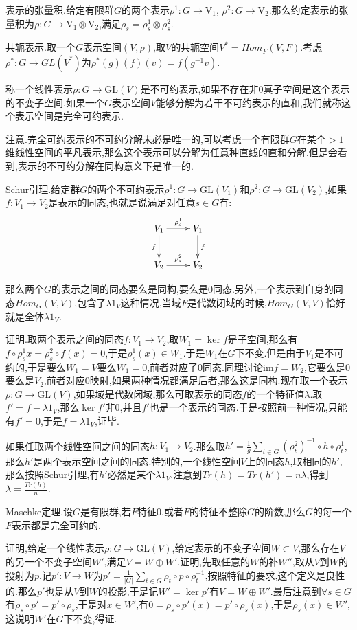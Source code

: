 表示的张量积.给定有限群$G$的两个表示$\rho^1:G\to\mathrm{V_1}$, $\rho^2:G\to\mathrm{V_2}$.那么约定表示的张量积为$\rho:G\to\mathrm{V_1\otimes V_2}$,满足$\rho_s=\rho_s^1\otimes\rho_s^2$.

共轭表示.取一个$G$表示空间$(V,\rho)$,取$V$的共轭空间$V^*=Hom_F(V,F)$.考虑$\rho^*:G\to GL(V^*)$为$\rho^*(g)(f)(v)=f(g^{-1}v)$.

称一个线性表示$\rho:G\to\mathrm{GL}(V)$是不可约表示,如果不存在非0真子空间是这个表示的不变子空间.如果一个$G$表示空间$V$能够分解为若干不可约表示的直和,我们就称这个表示空间是完全可约表示.

注意.完全可约表示的不可约分解未必是唯一的,可以考虑一个有限群$G$在某个$>1$维线性空间的平凡表示,那么这个表示可以分解为任意种直线的直和分解.但是会看到,表示的不可约分解在同构意义下是唯一的.

Schur引理.给定群$G$的两个不可约表示$\rho^1:G\to\mathrm{GL}(V_1)$和$\rho^2:G\to\mathrm{GL}(V_2)$,如果$f:V_1\to V_2$是表示的同态,也就是说满足对任意$s\in G$有:
$$\xymatrix{
V_1\ar[r]^{\rho^1_s}\ar[d]_{f}&V_1\ar[d]^f\\
V_2\ar[r]^{\rho^2_s}&V_2
}$$

那么两个$G$的表示之间的同态要么是同构,要么是0同态.另外,一个表示到自身的同态$Hom_G(V,V)$,包含了$\lambda 1_V$这种情况,当域$F$是代数闭域的时候,$Hom_G(V,V)$恰好就是全体$\lambda 1_V$.

证明.取两个表示之间的同态$f:V_1\to V_2$,取$W_1=\ker f$是子空间,那么有$f\circ\rho_s^1x=\rho_s^2\circ f(x)=0$,于是$\rho_s^1(x)\in W_1$.于是$W_1$在$G$下不变.但是由于$V_1$是不可约的,于是要么$W_1=V$要么$W_1=0$,前者对应了0同态.同理讨论$\mathrm{im}f=W_2$,它要么是0要么是$V_2$,前者对应0映射,如果两种情况都满足后者,那么这是同构.现在取一个表示$\rho:G\to\mathrm{GL}(V)$,如果域是代数闭域,那么可取表示的同态$f$的一个特征值$\lambda$.取$f'=f-\lambda 1_V$,那么$\ker f'$非0,并且$f'$也是一个表示的同态.于是按照前一种情况,只能有$f'=0$,于是$f=\lambda 1_V$,证毕.

如果任取两个线性空间之间的同态$h:V_1\to V_2$.那么取$h'=\frac{1} {g}\sum_{t\in G}(\rho_t^2)^{-1}\circ h\circ\rho_t^1$,那么$h'$是两个表示空间之间的同态.特别的,一个线性空间$V$上的同态$h$,取相同的$h'$,那么按照Schur引理,有$h'$必然是某个$\lambda 1_V$.注意到$Tr(h)=Tr(h')=n\lambda$,得到$\lambda=\frac{Tr(h)}{n}$.

Maschke定理.设$G$是有限群,若$F$特征0,或者$F$的特征不整除$G$的阶数,那么$G$的每一个$F$表示都是完全可约的.

证明,给定一个线性表示$\rho:G\to\mathrm{GL}(V)$,给定表示的不变子空间$W\subset V$,那么存在$V$的另一个不变子空间$W'$,满足$V=W\oplus W'$.证明,先取任意的$W$的补$W''$,取从$V$到$W$的投射为$p$,记$p':V\to W$为$p'=\frac{1}{|G|}\sum_{t\in G}\rho_t\circ p\circ\rho_t^{-1}$,按照特征的要求,这个定义是良性的.那么$p'$也是从$V$到$W$的投影,于是记$W'=\ker p'$有$V=W\oplus W'$.最后注意到$\forall s\in G$有$\rho_s\circ p'=p'\circ \rho_s$,于是对$x\in W'$,有$0=\rho_s\circ p'(x)=p'\circ\rho_s(x)$,于是$\rho_s(x)\in W'$,这说明$W'$在$G$下不变,得证.

